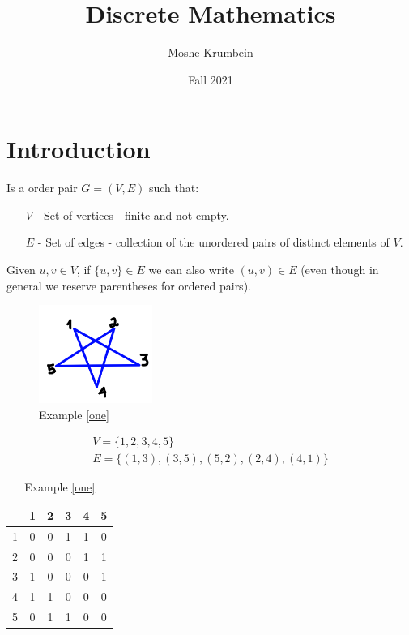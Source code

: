 \documentclass[00_complete]{subfiles}
\title{Discrete Mathematics}
\author{Moshe Krumbein}
\date{Fall 2021}
\begin{document}

\section{Introduction}
\begin{definition}
    Is a order pair $G=(V,E)$ such that:
    \begin{enumerate}
        \item[$V$ -] Set of vertices - finite and not empty.
        \item[$E$ -] Set of edges - collection of the unordered pairs of
            distinct elements of $V$.
    \end{enumerate}
    Given $u,v \in V$, if $\{u,v\} \in E$ we can also write $(u,v) \in E$ (even
    though in general we reserve parentheses for ordered pairs).
\end{definition}
\begin{example}
    \label{one}
    \begin{figure}[ht]
        \centering
        \includegraphics[width=0.33\textwidth]{w11_1}
        \caption{Example \ref{one}}
    \end{figure}
    \begin{gather*}
        V= \{1,2,3,4,5\} \\
        E=\{(1,3),(3,5),(5,2),(2,4),(4,1)\}
    \end{gather*}
    \begin{table}[ht!]
    \centering
    {\renewcommand{\arraystretch}{1.2}%
    \begin{tabular}{c|ccccc}
    & 1 & 2 & 3 & 4 & 5 \\
    \hline
        1 &0&0&1&1&0 \\
        2 &0&0&0&1&1 \\
        3 &1&0&0&0&1 \\
        4 &1&1&0&0&0 \\
        5 &0&1&1&0&0 \\
\end{tabular}}
\caption{Example \ref{one}}
\end{table}
\end{example}
\end{document}

